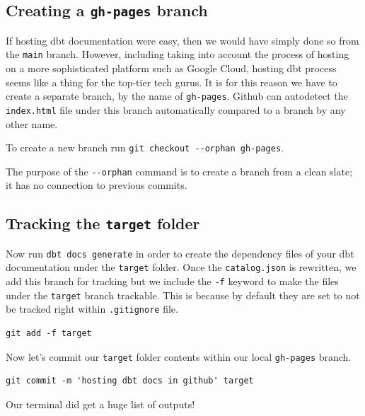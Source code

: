 \documentclass[
]{book}
\begin{document}
\hypertarget{creating-a-gh-pages-branch}{%
\subsection{\texorpdfstring{Creating a \texttt{gh-pages} branch}{Creating a gh-pages branch}}\label{creating-a-gh-pages-branch}}

If hosting dbt documentation were easy, then we would have simply done so from the \texttt{main} branch. However, including taking into account the process of hosting on a more sophisticated platform such as Google Cloud, hosting dbt process seems like a thing for the top-tier tech gurus. It is for this reason we have to create a separate branch, by the name of \texttt{gh-pages}. Github can autodetect the \texttt{index.html} file under this branch automatically compared to a branch by any other name.

To create a new branch run \texttt{git\ checkout\ -\/-orphan\ gh-pages}.

The purpose of the \texttt{-\/-orphan} command is to create a branch from a clean slate; it has no connection to previous commits.

\hypertarget{tracking-the-target-folder}{%
\subsection{\texorpdfstring{Tracking the \texttt{target} folder}{Tracking the target folder}}\label{tracking-the-target-folder}}

Now run \texttt{dbt\ docs\ generate} in order to create the dependency files of your dbt documentation under the \texttt{target} folder. Once the \texttt{catalog.json} is rewritten, we add this branch for tracking but we include the \texttt{-f} keyword to make the files under the \texttt{target} branch trackable. This is because by default they are set to not be tracked right within \texttt{.gitignore} file.

\begin{verbatim}
git add -f target
\end{verbatim}

Now let's commit our \texttt{target} folder contents within our local \texttt{gh-pages} branch.

\begin{verbatim}
git commit -m 'hosting dbt docs in github' target
\end{verbatim}

Our terminal did get a huge list of outputs!
\end{document}
